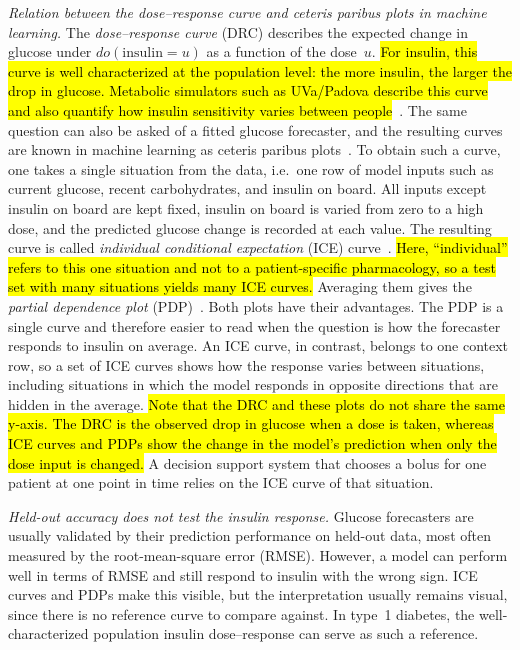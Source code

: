 \documentclass[a4paper,fleqn]{cas-sc}
\begin{document}
\noindent\textit{Relation between the dose--response curve and ceteris paribus plots in machine learning.}
The \emph{dose--response curve} (DRC) describes the expected change in glucose
under $do(\mathrm{insulin}{=}u)$ as a function of the dose~$u$. \hl{For insulin,
this curve is well characterized at the population level: the more insulin,
the larger the drop in glucose. Metabolic simulators such as UVa/Padova
describe this curve and also quantify how insulin sensitivity varies between
people}~\citep{dallaman2007,cobelli2009}. The same question can also be asked of
a fitted glucose forecaster, and the resulting curves are known in machine
learning as ceteris paribus plots~\citep{biecek2021}. To obtain such a curve,
one takes a single situation from the data, i.e.\ one row of model inputs such
as current glucose, recent carbohydrates, and insulin on board. All inputs
except insulin on board are kept fixed, insulin on board is varied from zero to
a high dose, and the predicted glucose change is recorded at each value. The
resulting curve is called \emph{individual conditional expectation} (ICE)
curve~\citep{goldstein2015}. \hl{Here, ``individual'' refers to this one situation
and not to a patient-specific pharmacology, so a test set with many situations
yields many ICE curves.} Averaging them gives the \emph{partial dependence plot}
(PDP)~\citep{friedman2001}. Both plots have their advantages. The PDP is a
single curve and therefore easier to read when the question is how the
forecaster responds to insulin on average. An ICE curve, in contrast, belongs
to one context row, so a set of ICE curves shows how the response varies
between situations, including situations in which the model responds in
opposite directions that are hidden in the average. \hl{Note that the DRC and these
plots do not share the same y-axis. The DRC is the observed drop in glucose when
a dose is taken, whereas ICE curves and PDPs show the change in the model's
prediction when only the dose input is changed.} A decision support system that
chooses a bolus for one patient at one point in time relies on the ICE curve of
that situation.

\noindent\textit{Held-out accuracy does not test the insulin response.}
Glucose forecasters are usually validated by their prediction performance on
held-out data, most often measured by the root-mean-square error (RMSE).
However, a model can perform well in terms of RMSE and still respond to insulin
with the wrong sign. ICE curves and PDPs make this visible, but the
interpretation usually remains visual, since there is no reference curve to
compare against. In type~1 diabetes, the well-characterized population insulin
dose--response can serve as such a reference.
\end{document}
